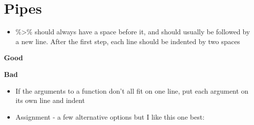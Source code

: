 \documentclass[
]{article}
\newenvironment{Shaded}{\begin{snugshade}}{\end{snugshade}}
\newcommand{\CommentTok}[1]{\textcolor[rgb]{0.56,0.35,0.01}{\textit{#1}}}
\providecommand{\tightlist}{%
  \setlength{\itemsep}{0pt}\setlength{\parskip}{0pt}}
\begin{document}
\hypertarget{pipes}{%
\section{Pipes}\label{pipes}}

\begin{itemize}
\tightlist
\item
  \%\textgreater\% should always have a space before it, and should
  usually be followed by a new line. After the first step, each line
  should be indented by two spaces
\end{itemize}

\textbf{Good}

\begin{Shaded}
\end{Shaded}

\textbf{Bad}

\begin{Shaded}
\end{Shaded}

\begin{itemize}
\tightlist
\item
  If the arguments to a function don't all fit on one line, put each
  argument on its own line and indent
\end{itemize}

\begin{Shaded}
\end{Shaded}

\begin{itemize}
\tightlist
\item
  Assignment - a few alternative options but I like this one best:
\end{itemize}
\end{document}
